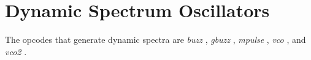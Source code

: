 \begin{comment}
\documentclass[10pt]{article}
\usepackage{fullpage, graphicx, url}
\setlength{\parskip}{1ex}
\setlength{\parindent}{0ex}
\title{Dynamic Spectrum Oscillators}



\begin{tabular}{ccc}
The Alternative Csound Reference Manual & & \\
Previous &Signal Generators &Next

\end{tabular}

\end{comment}
\section{Dynamic Spectrum Oscillators}


  The opcodes that generate dynamic spectra are \emph{buzz}
, \emph{gbuzz}
, \emph{mpulse}
, \emph{vco}
, and \emph{vco2}
. 


\begin{comment}
\begin{tabular}{lcr}
Previous &Home &Next \\
Basic Oscillators &Up &FM Synthesis

\end{tabular}



\end{comment}
